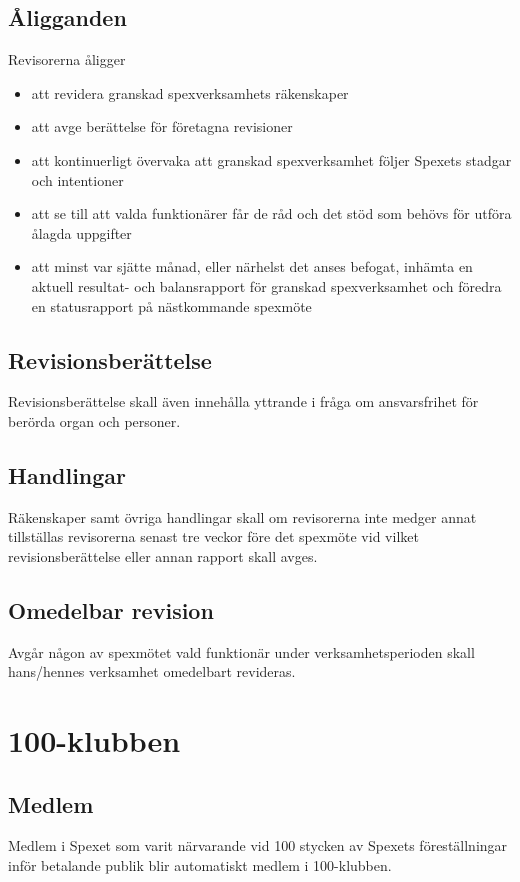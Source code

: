 \documentclass[a4paper]{article}
\begin{document}
\subsection{Åligganden}
Revisorerna åligger

\begin{itemize}
  \item att revidera granskad spexverksamhets räkenskaper
  \item att avge berättelse för företagna revisioner
  \item att kontinuerligt övervaka att granskad spexverksamhet följer Spexets stadgar och intentioner
  \item att se till att valda funktionärer får de råd och det stöd som behövs för utföra ålagda uppgifter
  \item att minst var sjätte månad, eller närhelst det anses befogat, inhämta en aktuell resultat- och balansrapport för granskad spexverksamhet och föredra en statusrapport på nästkommande spexmöte
\end{itemize}

\subsection{Revisionsberättelse}
Revisionsberättelse skall även innehålla yttrande i fråga om ansvarsfrihet för berörda organ och personer.

\subsection{Handlingar}
Räkenskaper samt övriga handlingar skall om revisorerna inte medger annat tillställas revisorerna senast tre veckor före det spexmöte vid vilket revisionsberättelse eller annan rapport skall avges.

\subsection{Omedelbar revision}
Avgår någon av spexmötet vald funktionär under verksamhetsperioden skall hans/hennes verksamhet omedelbart revideras.

\section{100-klubben}
\label{section:100-klubben}

\subsection{Medlem}
Medlem i Spexet som varit närvarande vid 100 stycken av Spexets föreställningar inför betalande publik blir automatiskt medlem i 100-klubben.
\end{document}

